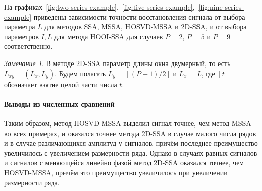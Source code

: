 \documentclass[specialist,
    substylefile = spbu_report.rtx,
    subf,href,colorlinks=true, 12pt]{disser}
\theoremstyle{plain}
\theoremstyle{definition}
\theoremstyle{remark}
\newtheorem*{remark}{Замечание}
\begin{document}
    На графиках~\ref{fig:two-series-example},~\ref{fig:five-series-example},~\ref{fig:nine-series-example}
    приведены зависимости точности восстановления
    сигнала от выбора параметра $L$ для методов SSA, MSSA, HOSVD-MSSA и 2D-SSA, и от
    выбора параметров $I, L$ для метода HOOI-SSA
    для случаев $P=2$, $P=5$ и $P=9$
    соответственно.

    \begin{remark}
        В методе 2D-SSA параметр длины окна двумерный, то есть $L_{xy}=(L_x, L_y)$.
        Будем полагать $L_y = [(P + 1) / 2]$ и $L_x=L$, где $[t]$ обозначает взятие
        целой части числа $t$.
    \end{remark}
    
    \paragraph{Выводы из численных сравнений}\label{par:numerical-comparison-res}
    Таким образом, метод HOSVD-MSSA выделил сигнал точнее, чем метод MSSA во всех примерах, и
    оказался точнее метода 2D-SSA в случае малого числа рядов и в случае различающихся
    амплитуд у сигналов, причём последнее преимущество увеличилось с увеличением размерности ряда.
    Однако в случаях равных сигналов и сигналов с меняющейся линейно фазой метод 2D-SSA оказался точнее,
    чем HOSVD-MSSA, причём это преимущество увеличилось при увеличении размерности ряда.
\end{document}
